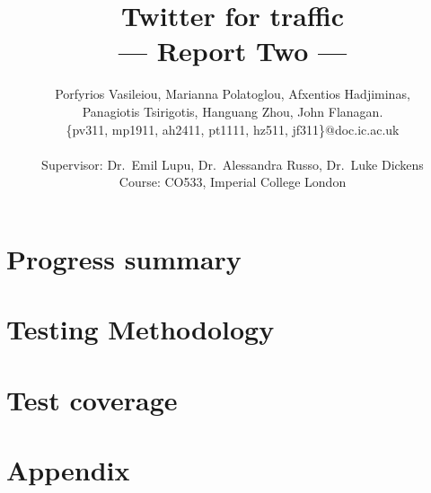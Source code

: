 \documentclass[a4paper,11pt]{article}
\title{Twitter for traffic\\\Large{--- Report Two ---}}
\author{Porfyrios Vasileiou, Marianna Polatoglou, Afxentios Hadjiminas,\\
        Panagiotis Tsirigotis, Hanguang Zhou, John Flanagan.\\
       \{pv311, mp1911, ah2411, pt1111, hz511, jf311\}@doc.ic.ac.uk\\ \\
       \small{Supervisor: Dr.\ Emil Lupu, Dr.\ Alessandra Russo, Dr.\ Luke Dickens}\\
       \small{Course: CO533, Imperial College London}
}
\begin{document}
\maketitle

\section{Progress summary}
	

\section{Testing Methodology}
	

\section{Test coverage}
	
\pagebreak
\section{Appendix}
	
%	
%	
\end{document}
